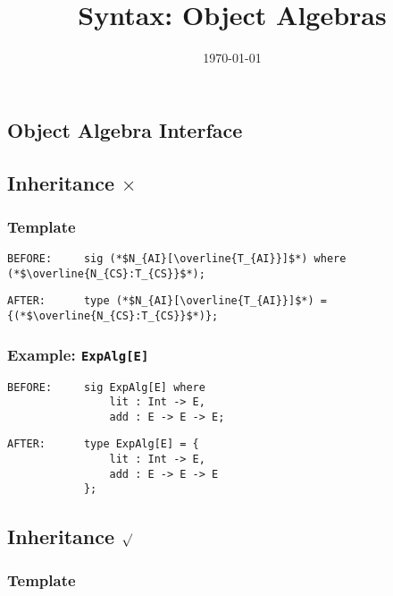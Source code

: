 \documentclass{article}
\title{\huge\textmd{\bf Syntax: Object Algebras}}
\date{}
\author{\today}
\begin{document}
\begin{spacing}{1.1}
\maketitle \thispagestyle{empty}


\section{Object Algebra Interface}

\subsection{Inheritance $\times$}

\subsubsection{Template}

\begin{lstlisting}[numbers=none]
BEFORE:     sig (*$N_{AI}[\overline{T_{AI}}]$*) where (*$\overline{N_{CS}:T_{CS}}$*);
\end{lstlisting}
\begin{lstlisting}[numbers=none]
AFTER:      type (*$N_{AI}[\overline{T_{AI}}]$*) = {(*$\overline{N_{CS}:T_{CS}}$*)};
\end{lstlisting}

\subsubsection{Example: \lstinline{ExpAlg[E]}}

\begin{lstlisting}[numbers=none]
BEFORE:     sig ExpAlg[E] where
                lit : Int -> E,
                add : E -> E -> E;
\end{lstlisting}
\begin{lstlisting}[numbers=none]
AFTER:      type ExpAlg[E] = {
                lit : Int -> E,
                add : E -> E -> E
            };
\end{lstlisting}

\subsection{Inheritance $\surd$}

\subsubsection{Template}


\end{spacing}
\end{document}
